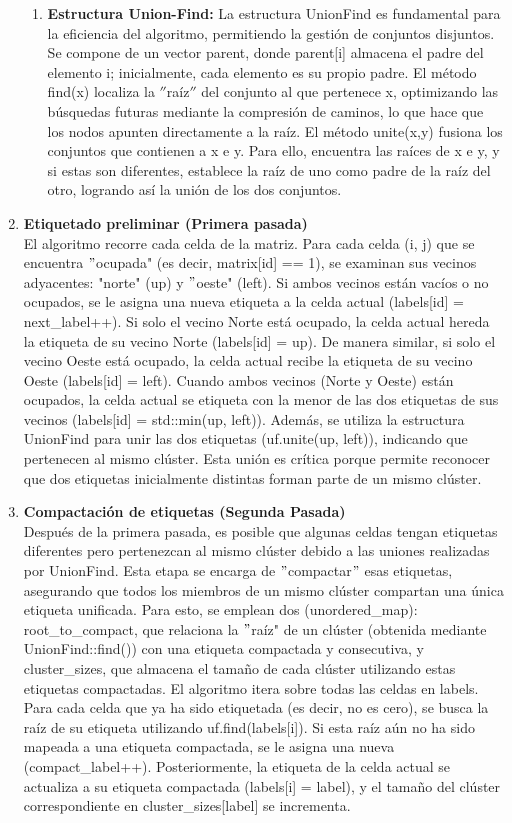 \documentclass[12pt,a4paper]{article}
\begin{document}
\begin{enumerate}[label=\textbf{\arabic*)}, ref=\arabic*)]
    \begin{enumerate}[label=\textbf{\roman*)}, ref=\roman*)]
        \item \textbf{Estructura Union-Find:} La estructura UnionFind es fundamental para la eficiencia del algoritmo, permitiendo la gestión de conjuntos disjuntos. Se compone de un vector parent, donde parent[i] almacena el padre del elemento i; inicialmente, cada elemento es su propio padre. El método find(x) localiza la $''$raíz$''$ del conjunto al que pertenece x, optimizando las búsquedas futuras mediante la compresión de caminos, lo que hace que los nodos apunten directamente a la raíz. El método unite(x,y) fusiona los conjuntos que contienen a x e y. Para ello, encuentra las raíces de x e y, y si estas son diferentes, establece la raíz de uno como padre de la raíz del otro, logrando así la unión de los dos conjuntos.
    \end{enumerate}
    \item \textbf{Etiquetado preliminar (Primera pasada)}\\
    El algoritmo recorre cada celda de la matriz. Para cada celda (i, j) que se encuentra $"$ocupada" (es decir, matrix[id] == 1), se examinan sus vecinos adyacentes: "norte" (up) y $"$oeste" (left). Si ambos vecinos están vacíos o no ocupados, se le asigna una nueva etiqueta a la celda actual (labels[id] = next\_label++). Si solo el vecino Norte está ocupado, la celda actual hereda la etiqueta de su vecino Norte (labels[id] = up). De manera similar, si solo el vecino Oeste está ocupado, la celda actual recibe la etiqueta de su vecino Oeste (labels[id] = left). Cuando ambos vecinos (Norte y Oeste) están ocupados, la celda actual se etiqueta con la menor de las dos etiquetas de sus vecinos (labels[id] = std::min(up, left)). Además, se utiliza la estructura UnionFind para unir las dos etiquetas (uf.unite(up, left)), indicando que pertenecen al mismo clúster. Esta unión es crítica porque permite reconocer que dos etiquetas inicialmente distintas forman parte de un mismo clúster.
    \item \textbf{Compactación de etiquetas (Segunda Pasada)}\\
    Después de la primera pasada, es posible que algunas celdas tengan etiquetas diferentes pero pertenezcan al mismo clúster debido a las uniones realizadas por UnionFind. Esta etapa se encarga de $"$compactar$"$ esas etiquetas, asegurando que todos los miembros de un mismo clúster compartan una única etiqueta unificada. Para esto, se emplean dos (unordered\_map): root\_to\_compact, que relaciona la $"$raíz" de un clúster (obtenida mediante UnionFind::find()) con una etiqueta compactada y consecutiva, y cluster\_sizes, que almacena el tamaño de cada clúster utilizando estas etiquetas compactadas. El algoritmo itera sobre todas las celdas en labels. Para cada celda que ya ha sido etiquetada (es decir, no es cero), se busca la raíz de su etiqueta utilizando uf.find(labels[i]). Si esta raíz aún no ha sido mapeada a una etiqueta compactada, se le asigna una nueva (compact\_label++). Posteriormente, la etiqueta de la celda actual se actualiza a su etiqueta compactada (labels[i] = label), y el tamaño del clúster correspondiente en cluster\_sizes[label] se incrementa.

\end{enumerate}
\end{document}
